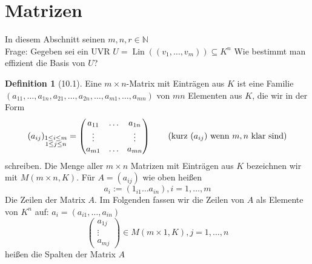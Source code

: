 \documentclass[a4paper]{scrartcl}
\DeclareMathOperator{\Lin}{Lin}
\theoremstyle{definition}
\newtheorem{defn}{Definition}
\theoremstyle{plain}
\theoremstyle{plain}
\theoremstyle{remark}
\theoremstyle{remark}
\theoremstyle{remark}
\theoremstyle{remark}
\theoremstyle{remark}
\begin{document}
\section{Matrizen}
\label{sec-7}
In diesem Abschnitt seinen $m,n,r\in\mathbb{N}$ \\
  Frage: Gegeben sei ein UVR $U = \Lin((v_1, \ldots, v_m)) \subseteq K^n$ Wie bestimmt man effizient die Basis von $U$?
\begin{defn}[10.1]
Eine $m\times n$-Matrix mit Einträgen aus $K$ ist eine Familie $(a_{11}, \ldots, a_{1n}, a_{21}, \ldots, a_{2n}, \ldots, a_{m1}, \ldots, a_{mn})$
von $m n$ Elementen aus $K$, die wir in der Form
\[(a_{ij})_{\substack{1\leq i \leq m \\ 1 \leq j \leq n}} = \begin{pmatrix} a_{11} & \ldots & a_{1n} \\ \vdots & & \vdots \\ a_{m 1} & \ldots & a_{mn} \end{pmatrix} \tag{kurz $(a_{ij})$ wenn $m,n$ klar sind}\]
schreiben. Die Menge aller $m\times n$ Matrizen mit Einträgen aus $K$ bezeichnen wir mit $M(m\times n, K)$.
Für $A = (a_{ij})$ wie oben heißen
\[a_i := (1_{i1} \ldots a_{in}), i = 1,\ldots, m\]
Die Zeilen der Matrix $A$. Im Folgenden fassen wir die Zeilen von $A$ als Elemente von $K^n$ auf: $a_i = (a_{i1}, \ldots, a_{in})$
\[\begin{pmatrix} a_{1j} \\ \vdots \\ a_{mj}\end{pmatrix} \in M(m\times 1, K), j = 1, \ldots, n\]
heißen die Spalten der Matrix $A$
\end{defn}
\end{document}
